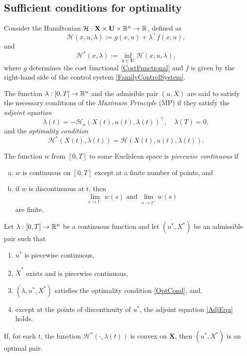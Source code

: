 \subsection{Sufficient conditions for optimality}

Consider the Hamiltonian $\mathcal{H}:\mathbf{X}\times\mathbf{U}\times\mathbb{R}^n\to \mathbb{R}$, defined as 
    \[\mathcal{H}(x,u,\lambda):= g(x,u) + \lambda^\top f(x,u),\]
and
\[ \mathcal{H}^\ast(x,\lambda)  :=  \inf_{u\in\mathbf{U}}\mathcal{H}(x,u,\lambda),\]
where $g$ determines the cost functional \eqref{CostFunctional} and $f$ is given by the right-hand side of the control system \eqref{FamilyControlSystem}.

 The function $\lambda:[0,T]\to \mathbb{R}^n$ and the admisible pair $(u,X)$ are said to satisfy the necessary conditions of the {\it Maximum Principle} (MP) if they satisfy the
 {\it adjoint equation}
\begin{equation}\label{AdjEqu}
         \dot{\lambda}(t) = -\mathcal{H}_x(X(t),u(t),\lambda(t))^\top, \quad \lambda(T)=0,
    \end{equation}
    and the {\it optimality condition}
 \begin{equation}\label{OptCond}
       \mathcal{H}^\ast(X(t),\lambda(t)) =
\mathcal{H}(X(t),u(t),\lambda(t)).
   \end{equation}





\begin{definition}\label{PiecewiseCont}\rm The function $w$ from $[0,T]$ to some Euclidean space is {\it piecewise continuous} if
\begin{enumerate}[(a)]
    \item $w$ is continuous on $[0,T]$ except at a finite number of points, and 
    \item if $w$ is discontinuous at $t$, then  
        \[\lim_{s\to t^-}w(s) \mbox{ and } \lim_{s\to t^+}w(s)\]
        are finite. 
\end{enumerate}
\end{definition}



\begin{theorem} Let $\lambda:[0,T]\to \mathbb{R}^n$  be a continuous function and let $(u^\ast,X^\ast)$ be an admissible pair such that 
\begin{enumerate}[\rm (a)]
    \item $u^\ast$ is piecewise continuous,
    \item $\dot{X}^\ast$ exists and is piecewise continuous,
    \item $(\lambda,u^\ast,X^\ast)$ satisfies the optimality condition \eqref{OptCond}, and,
    \item except at the points of discontinuity of $u^\ast$, the adjoint equation \eqref{AdjEqu} holds.
\end{enumerate}
If, for each $t$, the function $\mathcal{H}^\ast(\cdot,\lambda(t))$ is convex on $\mathbf{X}$, then $(u^\ast,X^\ast)$ is an optimal pair.
\end{theorem}

